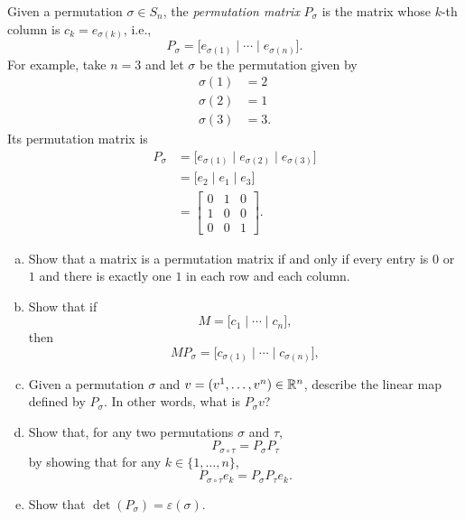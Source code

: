 \begin{exercise}
  \label{ex:hw05:permutation-matrices}
  Given a permutation \(\sigma\in S_n\), the \emph{permutation matrix}
  \(P_\sigma\) is the matrix whose \(k\)-th column is
  \(c_k=e_{\sigma(k)}\), i.e.,
  \[
    P_\sigma=\bigl[e_{\sigma(1)}\mid\cdots\mid e_{\sigma(n)}\bigr].
  \]
  For example, take \(n=3\) and let \(\sigma\) be the permutation given by
  \[
    \begin{aligned}
      \sigma(1)&=2\\
      \sigma(2)&=1\\
      \sigma(3)&=3.
    \end{aligned}
  \]
  Its permutation matrix is
  \[
    \begin{aligned}
      P_\sigma
        &=\bigl[e_{\sigma(1)}\mid e_{\sigma(2)}\mid e_{\sigma(3)}\bigr]\\
        &=\bigl[e_2\mid e_1\mid e_3\bigr]\\
        &=\begin{bmatrix}0&1&0\\1&0&0\\0&0&1\end{bmatrix}.
    \end{aligned}
  \]
  \begin{enumerate}[(a)][2]
    \item Show that a matrix is a permutation matrix if and only if every
      entry is \(0\) or \(1\) and there is exactly one \(1\) in each row
      and each column.
    \item Show that if
      \[
        M=\bigl[c_1\mid\cdots\mid c_n\bigr],
      \]
      then
      \[
        MP_\sigma=\bigl[c_{\sigma(1)}\mid\cdots\mid c_{\sigma(n)}\bigr],
      \]
    \item Given a permutation \(\sigma\) and
      \(v=(v^1,\ldots,v^n)\in\mathbb{R}^n\), describe the linear map defined
      by \(P_\sigma\). In other words, what is \(P_\sigma v\)?
    \item Show that, for any two permutations \(\sigma\) and \(\tau\),
      \[
        P_{\sigma\circ\tau}=P_\sigma P_\tau
      \]
      by showing that for any \(k\in\{1,\ldots,n\}\),
      \[
        P_{\sigma\circ\tau}e_k=P_\sigma P_\tau e_k.
      \]
    \item Show that \(\det(P_\sigma)=\varepsilon(\sigma)\).
  \end{enumerate}
\end{exercise}
